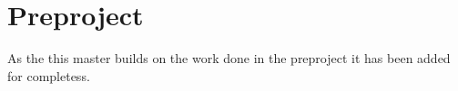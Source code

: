 \chapter{Preproject}
As the this master builds on the work done in the preproject it has been added for completess.
